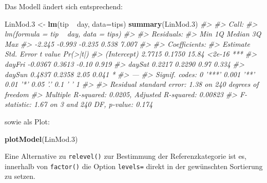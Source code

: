 \documentclass[12pt,ngerman,]{book}
\newenvironment{Shaded}{\begin{snugshade}}{\end{snugshade}}
\newcommand{\KeywordTok}[1]{\textcolor[rgb]{0.13,0.29,0.53}{\textbf{{#1}}}}
\newcommand{\DataTypeTok}[1]{\textcolor[rgb]{0.13,0.29,0.53}{{#1}}}
\newcommand{\FloatTok}[1]{\textcolor[rgb]{0.00,0.00,0.81}{{#1}}}
\newcommand{\StringTok}[1]{\textcolor[rgb]{0.31,0.60,0.02}{{#1}}}
\newcommand{\CommentTok}[1]{\textcolor[rgb]{0.56,0.35,0.01}{\textit{{#1}}}}
\newcommand{\NormalTok}[1]{{#1}}
\renewenvironment{Shaded}{\begin{kframe}}{\end{kframe}}
\begin{document}
Das Modell ändert sich entsprechend:

\begin{Shaded}
\begin{Highlighting}[]
\NormalTok{LinMod}\FloatTok{.3} \NormalTok{<-}\StringTok{ }\KeywordTok{lm}\NormalTok{(tip ~}\StringTok{ }\NormalTok{day, }\DataTypeTok{data=}\NormalTok{tips)}
\KeywordTok{summary}\NormalTok{(LinMod}\FloatTok{.3}\NormalTok{)}
\CommentTok{#> }
\CommentTok{#> Call:}
\CommentTok{#> lm(formula = tip ~ day, data = tips)}
\CommentTok{#> }
\CommentTok{#> Residuals:}
\CommentTok{#>    Min     1Q Median     3Q    Max }
\CommentTok{#> -2.245 -0.993 -0.235  0.538  7.007 }
\CommentTok{#> }
\CommentTok{#> Coefficients:}
\CommentTok{#>             Estimate Std. Error t value Pr(>|t|)    }
\CommentTok{#> (Intercept)   2.7715     0.1750   15.84   <2e-16 ***}
\CommentTok{#> dayFri       -0.0367     0.3613   -0.10    0.919    }
\CommentTok{#> daySat        0.2217     0.2290    0.97    0.334    }
\CommentTok{#> daySun        0.4837     0.2358    2.05    0.041 *  }
\CommentTok{#> ---}
\CommentTok{#> Signif. codes:  0 '***' 0.001 '**' 0.01 '*' 0.05 '.' 0.1 ' ' 1}
\CommentTok{#> }
\CommentTok{#> Residual standard error: 1.38 on 240 degrees of freedom}
\CommentTok{#> Multiple R-squared:  0.0205, Adjusted R-squared:  0.00823 }
\CommentTok{#> F-statistic: 1.67 on 3 and 240 DF,  p-value: 0.174}
\end{Highlighting}
\end{Shaded}

sowie als Plot:

\begin{Shaded}
\begin{Highlighting}[]
\KeywordTok{plotModel}\NormalTok{(LinMod}\FloatTok{.3}\NormalTok{)}
\end{Highlighting}
\end{Shaded}

Eine Alternative zu \texttt{relevel()} zur Bestimmung der
Referenzkategorie ist es, innerhalb von \texttt{factor()} die Option
\texttt{levels=} direkt in der gewünschten Sortierung zu setzen.

\begin{Shaded}
\end{Shaded}
\end{document}
